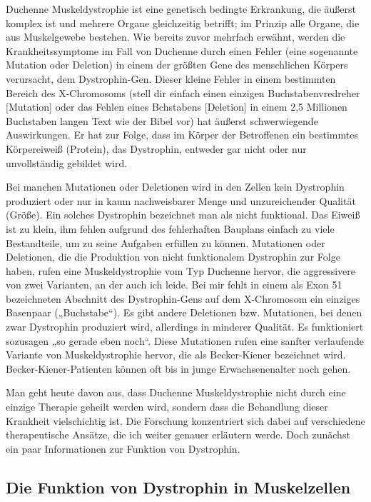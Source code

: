 \documentclass[fontsize=14pt,a4paper,headinclude,DIV=calc,automark]{scrbook}
\begin{document}
Duchenne Muskeldystrophie ist eine genetisch bedingte Erkrankung, die äußerst komplex ist und mehrere Organe gleichzeitig betrifft; im Prinzip alle Organe, die aus Muskelgewebe bestehen. Wie bereits zuvor mehrfach erwähnt, werden die Krankheitssymptome im Fall von Duchenne durch einen Fehler (eine sogenannte Mutation oder Deletion) in einem der größten Gene des menschlichen Körpers verursacht, dem Dystrophin-Gen. Dieser kleine Fehler in einem bestimmten Bereich des X-Chromosoms (stell dir einfach einen einzigen Buchstabenvredreher [Mutation] oder das Fehlen eines Bchstabens [Deletion] in einem 2,5 Millionen Buchstaben langen Text wie der Bibel vor) hat äußerst schwerwiegende Auswirkungen. Er hat zur Folge, dass im Körper der Betroffenen ein bestimmtes Körpereiweiß (Protein), das Dystrophin, entweder gar nicht oder nur unvollständig gebildet wird.

Bei manchen Mutationen oder Deletionen wird in den Zellen kein Dystrophin produziert oder nur in kaum nachweisbarer Menge und unzureichender Qualität (Größe). Ein solches Dystrophin bezeichnet man als nicht funktional. Das Eiweiß ist zu klein, ihm fehlen aufgrund des fehlerhaften Bauplans einfach zu viele Bestandteile, um zu seine Aufgaben erfüllen zu können. Mutationen oder Deletionen, die die Produktion von nicht funktionalem Dystrophin zur Folge haben, rufen eine Muskeldystrophie vom Typ Duchenne hervor, die aggressivere von zwei Varianten, an der auch ich leide. Bei mir fehlt in einem als Exon 51 bezeichneten Abschnitt des Dystrophin-Gens auf dem X-Chromosom ein einziges Basenpaar („Buchstabe“). Es gibt andere Deletionen bzw. Mutationen, bei denen zwar Dystrophin produziert wird, allerdings in minderer Qualität. Es funktioniert sozusagen „so gerade eben noch“. Diese Mutationen rufen eine sanfter verlaufende Variante von Muskeldystrophie hervor, die als Becker-Kiener bezeichnet wird. Becker-Kiener-Patienten können oft bis in junge Erwachsenenalter noch gehen.

Man geht heute davon aus, dass Duchenne Muskeldystrophie nicht durch eine einzige Therapie geheilt werden wird, sondern dass die Behandlung dieser Krankheit vielschichtig ist. Die Forschung konzentriert sich dabei auf verschiedene therapeutische Ansätze, die ich weiter genauer erläutern werde. Doch zunächst ein paar Informationen zur Funktion von Dystrophin.

\subsection{Die Funktion von Dystrophin in Muskelzellen}
\end{document}
